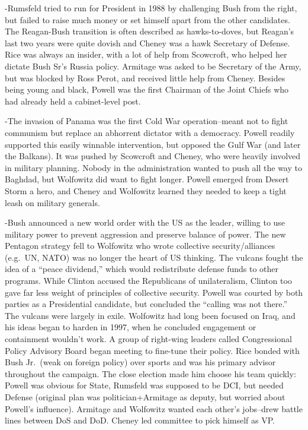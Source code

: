 \documentclass[
]{article}
\begin{document}
-Rumsfeld tried to run for President in 1988 by challenging Bush from
the right, but failed to raise much money or set himself apart from the
other candidates. The Reagan-Bush transition is often described as
hawks-to-doves, but Reagan's last two years were quite dovish and Cheney
was a hawk Secretary of Defense. Rice was always an insider, with a lot
of help from Scowcroft, who helped her dictate Bush Sr's Russia policy.
Armitage was asked to be Secretary of the Army, but was blocked by Ross
Perot, and received little help from Cheney. Besides being young and
black, Powell was the first Chairman of the Joint Chiefs who had already
held a cabinet-level post.

-The invasion of Panama was the first Cold War operation--meant not to
fight communism but replace an abhorrent dictator with a democracy.
Powell readily supported this easily winnable intervention, but opposed
the Gulf War (and later the Balkans). It was pushed by Scowcroft and
Cheney, who were heavily involved in military planning. Nobody in the
administration wanted to push all the way to Baghdad, but Wolfowitz did
want to fight longer. Powell emerged from Desert Storm a hero, and
Cheney and Wolfowitz learned they needed to keep a tight leash on
military generals.

-Bush announced a new world order with the US as the leader, willing to
use military power to prevent aggression and preserve balance of power.
The new Pentagon strategy fell to Wolfowitz who wrote collective
security/alliances (e.g.~UN, NATO) was no longer the heart of US
thinking. The vulcans fought the idea of a ``peace dividend,'' which
would redistribute defense funds to other programs. While Clinton
accused the Republicans of unilateralism, Clinton too gave far less
weight of principles of collective security. Powell was courted by both
parties as a Presidential candidate, but concluded the ``calling was not
there.'' The vulcans were largely in exile. Wolfowitz had long been
focused on Iraq, and his ideas began to harden in 1997, when he
concluded engagement or containment wouldn't work. A group of right-wing
leaders called Congressional Policy Advisory Board began meeting to
fine-tune their policy. Rice bonded with Bush Jr.~(weak on foreign
policy) over sports and was his primary advisor throughout the campaign.
The close election made him choose his team quickly: Powell was obvious
for State, Rumsfeld was supposed to be DCI, but needed Defense (original
plan was politician+Armitage as deputy, but worried about Powell's
influence). Armitage and Wolfowitz wanted each other's jobs--drew battle
lines between DoS and DoD. Cheney led committee to pick himself as VP.
\end{document}
